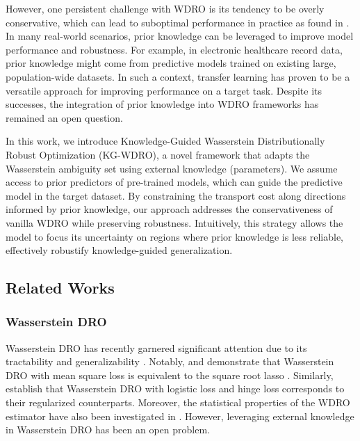 \documentclass[12pt]{article}
\begin{document}
However, one persistent challenge with WDRO is its tendency to be overly conservative, which can lead to suboptimal performance in practice as found in \cite{liu2024rethinkingdistributionshifts}. In many real-world scenarios, prior knowledge can be leveraged to improve model performance and robustness. For example, in electronic healthcare record data, prior knowledge might come from predictive models trained on existing large, population-wide datasets. In such a context, transfer learning has proven to be a versatile approach for  improving performance on a target task. Despite its successes, the integration of prior knowledge into WDRO frameworks has remained an open question.

In this work, we introduce Knowledge-Guided Wasserstein Distributionally Robust Optimization (KG-WDRO), a novel framework that adapts the Wasserstein ambiguity set using external knowledge (parameters). We assume access to prior predictors of pre-trained models, which can guide the predictive model in the target dataset. By constraining the transport cost along directions informed by prior knowledge, our approach addresses the conservativeness of vanilla WDRO while preserving robustness. Intuitively, this strategy allows the model to focus its uncertainty on regions where prior knowledge is less reliable, effectively robustify knowledge-guided generalization.

\subsection{Related Works}
\subsubsection{Wasserstein DRO}
Wasserstein DRO  has recently garnered significant attention due to its tractability \citep{blanchet2019quantifying, mohajerin2018data, gao2023distributionally} and generalizability \citep{blanchet2019rwpi, gao2022}. Notably, \citet{blanchet2019rwpi} and \citet{gao2022} demonstrate that Wasserstein DRO with mean square loss is equivalent to the square root lasso \cite{belloni2011sqrtlasso}. Similarly, \citet{abadeh2015drologistic, abadeh2019regularizationviamass, blanchet2019rwpi, gao2022} establish that Wasserstein DRO with logistic loss and hinge loss corresponds to their regularized counterparts. Moreover, the statistical properties of the WDRO estimator have also been investigated in \cite{blanchet2021statistical, blanchet2022confidence, gao2023finite}. However, leveraging external knowledge in Wasserstein DRO has been an open problem.
\end{document}
